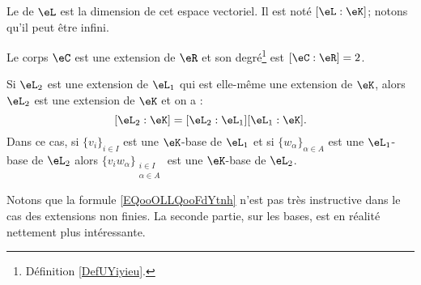 \begin{definition}      \label{DefUYiyieu}
	Le  de \( \eL\) est la dimension de cet espace vectoriel. Il est noté \( [\eL:\eK]\); notons qu'il peut être infini.
\end{definition}

\begin{proposition}	\label{PROPooCFGUooCQqWZd}
	Le corps \( \eC\) est une extension de \( \eR\) et son degré\footnote{Définition \ref{DefUYiyieu}.} est \( [\eC:\eR]=2\).
\end{proposition}

\begin{proposition}        \label{PROPooEGSJooBSocTf} \label{PropGWazMpY}
	Si \( \eL_2\) est une extension de \( \eL_1\) qui est elle-même une extension de \( \eK\), alors \( \eL_2\) est une extension de \( \eK\) et on a :
	\begin{equation}        \label{EQooOLLQooFdYtnh}
		[\eL_2:\eK]=[\eL_2:\eL_1][\eL_1:\eK].
	\end{equation}
	Dans ce cas, si \( \{ v_i \}_{i\in I}\) est une \( \eK\)-base de \( \eL_1\) et si \( \{ w_{\alpha} \}_{\alpha\in A}\) est une \( \eL_1\)-base de \( \eL_2\) alors \( \{ v_iw_{\alpha} \}_{\substack{i\in I\\\alpha\in A}}\) est une \( \eK\)-base de \( \eL_2\).
\end{proposition}

Notons que la formule \eqref{EQooOLLQooFdYtnh} n'est pas très instructive dans le cas des extensions non finies. La seconde partie, sur les bases, est en réalité nettement plus intéressante.

